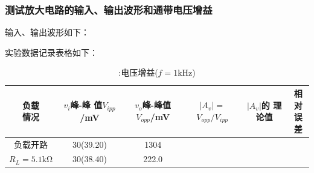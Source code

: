 \documentclass[a4paper,11pt,UTF8]{article}
\numberwithin{equation}{subsection}
\begin{document}
\subsubsection{测试放大电路的输入、输出波形和通带电压增益}
输入、输出波形如下：
\begin{figure}[H]
\end{figure}
实验数据记录表格如下：
\begin{table}[H]
	\centering
	\begin{tabular}{|c|c|c|c|c|c|}
			\hline
			\shortstack{负载\\情况} & \shortstack{$v_i$峰-峰\\值$V_{ipp}$/mV} & \shortstack{$v_o$峰-峰值\\$V_{opp}$/mV} & \shortstack{$|A_v|=$\\$V_{opp}/V_{ipp}$}	& \shortstack{$|A_v|$的\\理论值} & \shortstack{相对\\误差}\\
			\hline
			负载开路 & 30(39.20) & 1304&&&\\
			\hline
			$R_L=5.1\mathrm{k\Omega}$ & 30(38.40) & 222.0 &&&\\
			\hline		
		\end{tabular}
	\caption{:电压增益($f\mathrm{=}\mathrm{1kHz}$)}
\end{table}
\end{document}
